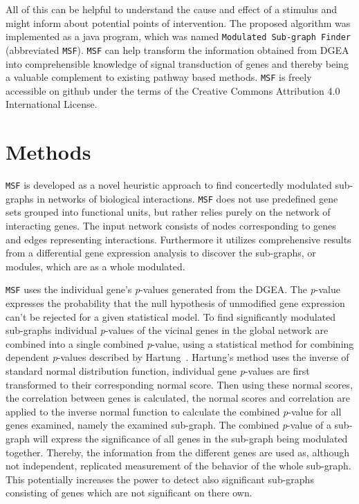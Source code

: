 \documentclass[10pt,a4paper,twocolumn]{article}
\begin{document}
All of this can be helpful to understand the cause and effect of a stimulus
and might inform about potential points of intervention. The proposed
algorithm was implemented as a java program, which was named
\texttt{Modulated Sub-graph Finder} (abbreviated
\texttt{MSF}). \texttt{MSF} can help transform the information obtained
from DGEA into comprehensible knowledge of signal transduction of genes and
thereby being a valuable complement to existing pathway based
methods. \texttt{MSF} is freely accessible on github under the terms of the
Creative Commons Attribution 4.0 International License.

\section*{Methods}
\texttt{MSF} is developed as a novel heuristic approach to find concertedly
modulated sub-graphs in networks of biological interactions.  \texttt{MSF}
does not use predefined gene sets grouped into functional units, but rather
relies purely on the network of interacting genes.  The input network
consists of nodes corresponding to genes and edges representing
interactions. Furthermore it utilizes comprehensive results from a
differential gene expression analysis to discover the sub-graphs, or
modules, which are as a whole modulated.

\texttt{MSF} uses the individual gene's \textit{p}-values generated from
the DGEA. The \textit{p}-value expresses the probability that the null
hypothesis of unmodified gene expression can't be rejected for a given
statistical model. To find significantly modulated sub-graphs individual
\textit{p}-values of the vicinal genes in the global network are combined
into a single combined \textit{p}-value, using a statistical method for
combining dependent \textit{p}-values described by
Hartung~\cite{Hartung}. Hartung's method uses the inverse of standard
normal distribution function, individual gene \textit{p}-values are first
transformed to their corresponding normal score. Then using these normal
scores, the correlation between genes is calculated, the normal scores and
correlation are applied to the inverse normal function to calculate the
combined \textit{p}-value for all genes examined, namely the examined
sub-graph. The combined \textit{p}-value of a sub-graph will express the
significance of all genes in the sub-graph being modulated
together. Thereby, the information from the different genes are used as,
although not independent, replicated measurement of the behavior of the
whole sub-graph. This potentially increases the power to detect also
significant sub-graphs consisting of genes which are not significant on
there own.
\newline
\end{document}

